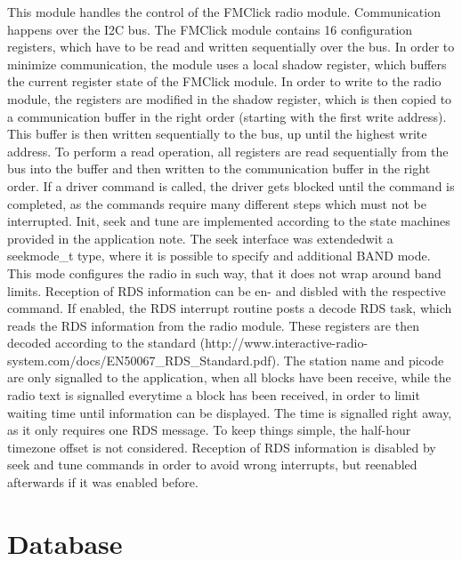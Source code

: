 \documentclass[12pt,a4paper,titlepage,oneside]{article}
\begin{document}
This module handles the control of the FMClick radio module. Communication
happens over the I2C bus. The FMClick module contains 16 configuration registers,
which have to be read and written sequentially over the bus. In order to minimize
communication, the module uses a local shadow register, which buffers the current
register state of the FMClick module. In order to write to the radio module,
the registers are modified in the shadow register, which is then copied to a 
communication buffer in the right order (starting with the first write address).
This buffer is then written sequentially to the bus, up until the highest write
address. To perform a read operation, all registers are read sequentially from the
bus into the buffer and then written to the communication buffer in the right
order. If a driver command is called, the driver gets blocked until the command
is completed, as the commands require many different steps which must not be
interrupted. Init, seek and tune are implemented according to the state machines
provided in the application note. The seek interface was extendedwit a seekmode\_t
type, where it is possible to specify and additional BAND mode. This mode configures
the radio in such way, that it does not wrap around band limits. Reception of
RDS information can be en- and disbled with the respective command. If enabled, 
the RDS interrupt routine posts a decode RDS task, which reads the RDS information
from the radio module. These registers are then decoded according to the standard
(http://www.interactive-radio-system.com/docs/EN50067\_RDS\_Standard.pdf). The station name
and picode are only signalled to the application, when all blocks have been receive, while
the radio text is signalled everytime a block has been received, in order to limit
waiting time until information can be displayed. The time is signalled right away,
as it only requires one RDS message. To keep things simple, the half-hour timezone
offset is not considered. Reception of RDS information is disabled by seek and 
tune commands in order to avoid wrong interrupts, but reenabled afterwards if
it was enabled before.

\section{Database}
\end{document}

